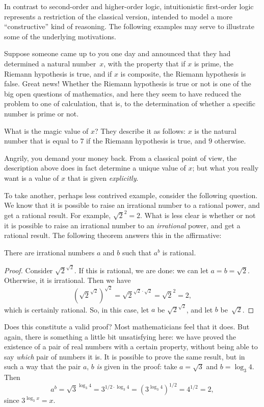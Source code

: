 \documentclass[../../../include/open-logic-section]{subfiles}
\begin{document}

In contrast to second-order and higher-order logic, intuitionistic
first-order logic represents a restriction of the classical version,
intended to model a more ``constructive'' kind of reasoning. The
following examples may serve to illustrate some of the underlying
motivations.

Suppose someone came up to you one day and announced that they had
determined a natural number~$x$, with the property that if $x$ is
prime, the Riemann hypothesis is true, and if $x$ is composite, the
Riemann hypothesis is false. Great news!{} Whether the Riemann
hypothesis is true or not is one of the big open questions of
mathematics, and here they seem to have reduced the problem to one of
calculation, that is, to the determination of whether a specific
number is prime or not.

What is the magic value of $x$? They describe it as follows: $x$ is
the natural number that is equal to $7$ if the Riemann hypothesis is
true, and $9$ otherwise.

Angrily, you demand your money back. From a classical point of view,
the description above does in fact determine a unique value of $x$;
but what you really want is a value of $x$ that is given
\emph{explicitly}.

To take another, perhaps less contrived example, consider the
following question. We know that it is possible to raise an irrational
number to a rational power, and get a rational result. For example,
$\sqrt{2}^2 = 2$. What is less clear is whether or not it is possible
to raise an irrational number to an \emph{irrational} power, and get a
rational result. The following theorem answers this in the
affirmative:

\begin{thm}
There are irrational numbers $a$ and $b$ such that $a^b$ is rational.
\end{thm}

\begin{proof}
Consider $\sqrt{2}^{\sqrt{2}}$. If this is rational, we are done:
we can let $a = b = \sqrt{2}$. Otherwise, it is irrational. Then we
have
\[
(\sqrt{2}^{\sqrt{2}})^{\sqrt{2}} = \sqrt{2}^{\sqrt{2} \cdot
  \sqrt{2}} = \sqrt{2}^2 = 2,
\]
which is certainly rational. So, in this case, let $a$ be
$\sqrt{2}^{\sqrt{2}}$, and let $b$ be~$\sqrt 2$.
\end{proof}

Does this constitute a valid proof? Most mathematicians feel that it
does. But again, there is something a little bit unsatisfying here: we
have proved the existence of a pair of real numbers with a certain
property, without being able to say \emph{which} pair of numbers it
is.  It is possible to prove the same result, but in such a way that
the pair $a$, $b$ \emph{is} given in the proof: take $a = \sqrt{3}$
and $b = \log_3 4$. Then
\[
a^b = \sqrt{3}^{\log_3 4} = 3^{1/2 \cdot \log_3 4} = (3^{\log_3
  4})^{1/2} = 4^{1/2}= 2,
\]
since $3^{\log_3 x} = x$.
\end{document}

